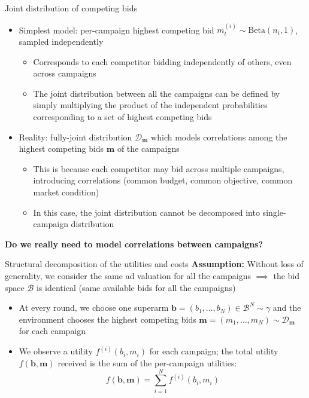 \begin{frame}{Joint distribution of competing bids}
    \begin{itemize}
        \item Simplest model: per-campaign highest competing bid $m_t^{(i)} \sim \mathrm{Beta}(n_i, 1)$, sampled independently
        \begin{itemize}
            \item Corresponds to each competitor bidding independently of others, even across campaigns
            \item The joint distribution between all the campaigns can be defined by simply multiplying the product of the independent probabilities corresponding to a set of highest competing bids
        \end{itemize}
        \item Reality: fully-joint distribution $\mathcal{D_\mathbf{m}}$ which models correlations among the highest competing bids $\mathbf{m}$ of the campaigns 
        \begin{itemize}
            \item This is because each competitor may bid across multiple campaigns, introducing correlations (common budget, common objective, common market condition)
            \item In this case, the joint distribution cannot be decomposed into single-campaign distribution
        \end{itemize}
    \end{itemize}

    \begin{block}{}
        \textbf{Do we really need to model correlations between campaigns?}
    \end{block}
\end{frame}

\begin{frame}{Structural decomposition of the utilities and costs}
    \textbf{Assumption:} Without loss of generality, we consider the same ad valuation for all the campaigns $\implies$ the bid space $\mathcal{B}$ is identical (same available bids for all the campaigns)

    \vspace{0.5cm}

    \begin{itemize}
        \item At every round, we choose one superarm $\mathbf{b} = (b_1,\ldots,b_N) \in \mathcal{B}^N \sim \gamma$ and the environment chooses the highest competing bids $\mathbf{m} = (m_1,\ldots,m_N) \sim \mathcal{D}_\mathbf{m}$ for each campaign

        \item We observe a utility $f^{(i)}(b_i, m_i)$ for each campaign; the total utility $f(\mathbf{b}, \mathbf{m})$ received is the sum of the per-campaign utilities: 
        \[ f(\mathbf{b}, \mathbf{m}) = \sum_{i=1}^N f^{(i)}(b_i, m_i) \]
    \end{itemize}
\end{frame}

